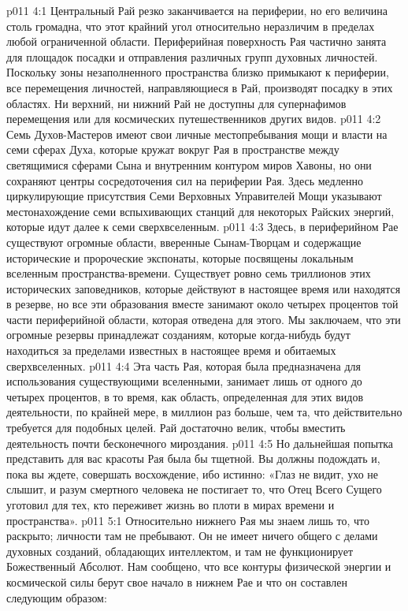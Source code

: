 \vs p011 4:1 Центральный Рай резко заканчивается на периферии, но его величина столь громадна, что этот крайний угол относительно неразличим в пределах любой ограниченной области. Периферийная поверхность Рая частично занята для площадок посадки и отправления различных групп духовных личностей. Поскольку зоны незаполненного пространства близко примыкают к периферии, все перемещения личностей, направляющиеся в Рай, производят посадку в этих областях. Ни верхний, ни нижний Рай не доступны для супернафимов перемещения или для космических путешественников других видов.
\vs p011 4:2 Семь Духов\hyp{}Мастеров имеют свои личные местопребывания мощи и власти на семи сферах Духа, которые кружат вокруг Рая в пространстве между светящимися сферами Сына и внутренним контуром миров Хавоны, но они сохраняют центры сосредоточения сил на периферии Рая. Здесь медленно циркулирующие присутствия Семи Верховных Управителей Мощи указывают местонахождение семи вспыхивающих станций для некоторых Райских энергий, которые идут далее к семи сверхвселенным.
\vs p011 4:3 Здесь, в периферийном Рае существуют огромные области, вверенные Сынам\hyp{}Творцам и содержащие исторические и пророческие экспонаты, которые посвящены локальным вселенным пространства\hyp{}времени. Существует ровно семь триллионов этих исторических заповедников, которые действуют в настоящее время или находятся в резерве, но все эти образования вместе занимают около четырех процентов той части периферийной области, которая отведена для этого. Мы заключаем, что эти огромные резервы принадлежат созданиям, которые когда\hyp{}нибудь будут находиться за пределами известных в настоящее время и обитаемых сверхвселенных.
\vs p011 4:4 Эта часть Рая, которая была предназначена для использования существующими вселенными, занимает лишь от одного до четырех процентов, в то время, как область, определенная для этих видов деятельности, по крайней мере, в миллион раз больше, чем та, что действительно требуется для подобных целей. Рай достаточно велик, чтобы вместить деятельность почти бесконечного мироздания.
\vs p011 4:5 Но дальнейшая попытка представить для вас красоты Рая была бы тщетной. Вы должны подождать и, пока вы ждете, совершать восхождение, ибо истинно: «Глаз не видит, ухо не слышит, и разум смертного человека не постигает то, что Отец Всего Сущего уготовил для тех, кто переживет жизнь во плоти в мирах времени и пространства».
\vs p011 5:1 Относительно нижнего Рая мы знаем лишь то, что раскрыто; личности там не пребывают. Он не имеет ничего общего с делами духовных созданий, обладающих интеллектом, и там не функционирует Божественный Абсолют. Нам сообщено, что все контуры физической энергии и космической силы берут свое начало в нижнем Рае и что он составлен следующим образом:
